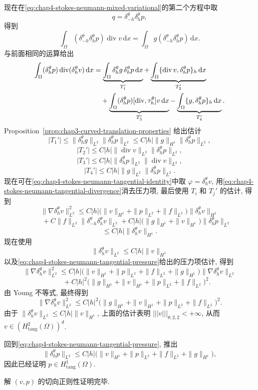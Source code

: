 \begin{Proof}
现在在\eqref{eq:chap4-stokes-neumann-mixed-variational}的第二个方程中取
\[
 q=\delta_{-h}^\theta\delta_h^\theta p,
\]
得到
\[
 \int_\Omega(\delta_{-h}^\theta\delta_h^\theta p)\operatorname{div}v\,\mathrm dx
 =\int_\Omega g(\delta_{-h}^\theta\delta_h^\theta p)\,\mathrm dx.
\]
与前面相同的运算给出
\begin{align}
 \int_\Omega(\delta_h^\theta p)\operatorname{div}(\delta_h^\theta v)\,\mathrm dx
 &=\underbrace{\int_\Omega\delta_h^\theta g\,\delta_h^\theta p\,\mathrm dx}_{T_1'}
 +\underbrace{\int_\Omega\{\operatorname{div}v,\delta_h^\theta p\}_h\,\mathrm dx}_{T_2'}\notag\\
 &\quad+\underbrace{\int_\Omega(\delta_h^\theta p)[\operatorname{div},\tau_h^\theta]v\,\mathrm dx}_{T_3'}
 -\underbrace{\int_\Omega\{g,\delta_h^\theta p\}_h\,\mathrm dx}_{T_4'}.
 \label{eq:chap4-stokes-neumann-tangential-divergence}
\end{align}
Proposition~\ref{prop:chap3-curved-translation-properties} 给出估计
\[
 |T_1'|\leq\|\delta_h^\theta g\|_{L^2}\|\delta_h^\theta p\|_{L^2}
 \leq C|h|\|g\|_{H^1}\|\delta_h^\theta p\|_{L^2},
\]
\[
 |T_2'|\leq C|h|\|\operatorname{div}v\|_{L^2}\|\delta_h^\theta p\|_{L^2},
\]
\[
 |T_3'|\leq C|h|\|\delta_h^\theta p\|_{L^2}\|\operatorname{div}v\|_{L^2},
\]
\[
 |T_4'|\leq C|h|\|g\|_{L^2}\|\delta_h^\theta p\|_{L^2}.
\]
现在可在\eqref{eq:chap4-stokes-neumann-tangential-identity}中取 $\varphi=\delta_h^\theta v$, 用\eqref{eq:chap4-stokes-neumann-tangential-divergence}消去压力项, 最后使用 $T_i$ 和 $T_j'$ 的估计, 得到
\[
 \|\nabla\delta_h^\theta v\|_{L^2}^2
 \leq C|h|\bigl(\|v\|_{H^1}+\|p\|_{L^2}+\|f\|_{L^2}\bigr)
 \|\delta_h^\theta v\|_{H^1}
\]
\[
 \qquad+C\|f\|_{L^2}\|\delta_{-h}^\theta\delta_h^\theta v\|_{L^2}
 +C|h|\bigl(\|g\|_{H^1}+\|v\|_{H^1}\bigr)\|\delta_h^\theta p\|_{L^2}
\]
\[
 \leq C|h|\|\delta_h^\theta v\|_{H^1}.
\]
现在使用
\[
 \|\delta_h^\theta v\|_{L^2}\leq C|h|\|v\|_{H^1}
\]
以及\eqref{eq:chap4-stokes-neumann-tangential-pressure}给出的压力项估计, 得到
\[
 \|\nabla\delta_h^\theta v\|_{L^2}^2
 \leq C|h|\bigl(\|v\|_{H^1}+\|p\|_{L^2}+\|f\|_{L^2}+\|g\|_{H^1}\bigr)
 \|\nabla\delta_h^\theta v\|_{L^2}
\]
\[
 \qquad+C|h|^2
 \bigl(\|g\|_{H^1}+\|v\|_{H^1}+\|p\|_{L^2}+\|f\|_{L^2}\bigr)^2.
\]
由 Young 不等式, 最终得到
\[
 \|\nabla\delta_h^\theta v\|_{L^2}^2
 \leq C|h|^2
 \bigl(\|g\|_{H^1}+\|v\|_{H^1}+\|p\|_{L^2}+\|f\|_{L^2}\bigr)^2.
\]
由于 $\|\delta_h^\theta v\|_{L^2}\leq C|h|\|v\|_{H^1}$, 上面的估计表明 $|||v|||_{\theta,2,2}<+\infty$, 从而 $v\in(H_{\mathrm{tang}}^2(\Omega))^d$.

回到\eqref{eq:chap4-stokes-neumann-tangential-pressure}, 推出
\[
 \|\delta_h^\theta p\|_{L^2}
 \leq C|h|\bigl(\|v\|_{H^1}+\|p\|_{L^2}+\|f\|_{L^2}+\|g\|_{H^1}\bigr),
\]
因此已经证明 $p\in H_{\mathrm{tang}}^1(\Omega)$.

解 $(v,p)$ 的切向正则性证明完毕.
\end{Proof}

